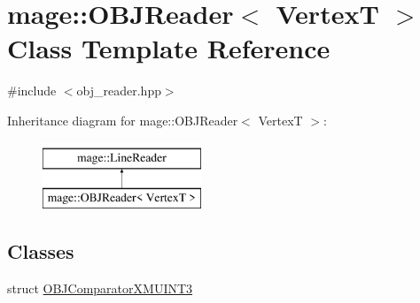 \hypertarget{classmage_1_1_o_b_j_reader}{}\section{mage\+:\+:O\+B\+J\+Reader$<$ VertexT $>$ Class Template Reference}
\label{classmage_1_1_o_b_j_reader}


{\ttfamily \#include $<$obj\+\_\+reader.\+hpp$>$}

Inheritance diagram for mage\+:\+:O\+B\+J\+Reader$<$ VertexT $>$\+:\begin{figure}[H]
\begin{center}
\leavevmode
\includegraphics[height=2.000000cm]{classmage_1_1_o_b_j_reader}
\end{center}
\end{figure}
\subsection*{Classes}
\begin{DoxyCompactItemize}
\item 
struct \hyperlink{structmage_1_1_o_b_j_reader_1_1_o_b_j_comparator_x_m_u_i_n_t3}{O\+B\+J\+Comparator\+X\+M\+U\+I\+N\+T3}
\end{DoxyCompactItemize}
